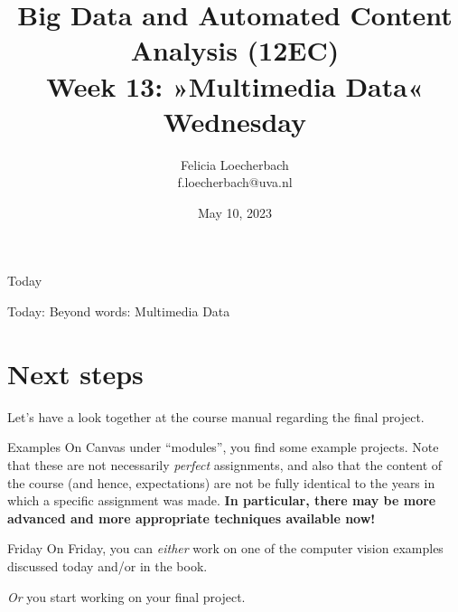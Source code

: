 

\graphicspath{{../../resources/img/}}




\title[Big Data and Automated Content Analysis]{\textbf{Big Data and Automated Content Analysis (12EC)} 
\\Week 13: »Multimedia Data«
\\Wednesday}
\author[Felicia Loecherbach]{Felicia Loecherbach\\ \footnotesize{f.loecherbach@uva.nl \\}}
\date{May 10, 2023}


\begin{frame}{}
	\titlepage
\end{frame}

\begin{frame}{Today}
	\tableofcontents
\end{frame}


\begin{frame}[standout]
Today: Beyond words: Multimedia Data
\end{frame}









\section{Next steps}
\begin{frame}[standout]
Let's have a look together at the course manual regarding the final project.
\end{frame}

\begin{frame}{Examples}
On Canvas under ``modules'', you find some example projects. Note that these are not necessarily \emph{perfect} assignments, and also that the content of the course (and hence, expectations) are not be fully identical to the years in which a specific assignment was made. \textbf{In particular, there may be more advanced and more appropriate techniques available now!}
\end{frame}

\begin{frame}{Friday}
On Friday, you can \emph{either} work on one of the computer vision examples discussed today and/or in the book.

\emph{Or} you start working on your final project.

\end{frame}


\begin{frame}
\printbibliography
\end{frame}




